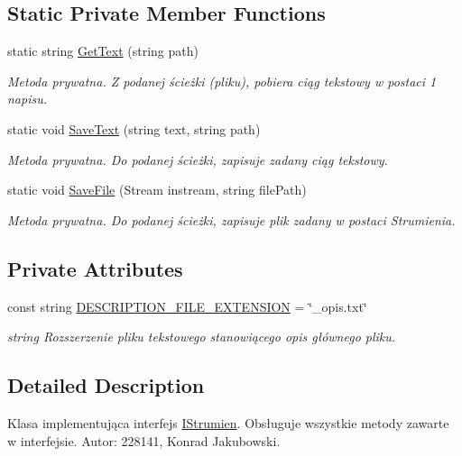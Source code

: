 \subsection*{Static Private Member Functions}
\begin{DoxyCompactItemize}
\item 
static string \hyperlink{class_wcf_stream_service_contract_1_1_moj_strumien_aa6fbe99058d30cab2dc035310c441664}{Get\+Text} (string path)
\begin{DoxyCompactList}\small\item\em Metoda prywatna. Z podanej ścieżki (pliku), pobiera ciąg tekstowy w postaci 1 napisu. \end{DoxyCompactList}\item 
static void \hyperlink{class_wcf_stream_service_contract_1_1_moj_strumien_ae8467c3fc2f5c144b588e98bdbf6d0a5}{Save\+Text} (string text, string path)
\begin{DoxyCompactList}\small\item\em Metoda prywatna. Do podanej ścieżki, zapisuje zadany ciąg tekstowy. \end{DoxyCompactList}\item 
static void \hyperlink{class_wcf_stream_service_contract_1_1_moj_strumien_a564bd50d25c5facb1ce1d5eacd966881}{Save\+File} (Stream instream, string file\+Path)
\begin{DoxyCompactList}\small\item\em Metoda prywatna. Do podanej ścieżki, zapisuje plik zadany w postaci Strumienia. \end{DoxyCompactList}\end{DoxyCompactItemize}
\subsection*{Private Attributes}
\begin{DoxyCompactItemize}
\item 
const string \hyperlink{class_wcf_stream_service_contract_1_1_moj_strumien_acdde11903400acb6062b4b733c86fa4f}{D\+E\+S\+C\+R\+I\+P\+T\+I\+O\+N\+\_\+\+F\+I\+L\+E\+\_\+\+E\+X\+T\+E\+N\+S\+I\+ON} = \char`\"{}\+\_\+opis.\+txt\char`\"{}
\begin{DoxyCompactList}\small\item\em string Rozszerzenie pliku tekstowego stanowiącego opis głównego pliku. \end{DoxyCompactList}\end{DoxyCompactItemize}


\subsection{Detailed Description}
Klasa implementująca interfejs \textquotesingle{}\hyperlink{interface_wcf_stream_service_contract_1_1_i_strumien}{I\+Strumien}\textquotesingle{}. Obsługuje wszystkie metody zawarte w interfejsie. Autor\+: 228141, Konrad Jakubowski. 



